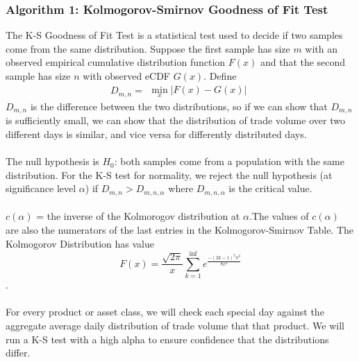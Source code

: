 \documentclass[11pt]{article}
\begin{document}
\subsubsection*{Algorithm 1: Kolmogorov-Smirnov Goodness of Fit Test}
The K-S Goodness of Fit Test is a statistical test used to decide if two samples come from the same distribution. Suppose the first sample has size $m$ with an observed empirical cumulative distribution function $F(x)$ and that the second sample has size $n$ with observed eCDF $G(x)$. Define
\begin{equation}D_{m,n} = 
\begin{aligned}
\min_{x} |F(x) - G(x)|
\end{aligned}
\end{equation}
$D_{m,n}$ is the difference between the two distributions, so if we can show that $D_{m,n}$ is sufficiently small, we can show that the distribution of trade volume over two different days is similar, and vice versa for differently distributed days. 
\\\\The null hypothesis is $H_0$: both samples come from a population with the same distribution. For the K-S test for normality, we reject the null hypothesis (at significance level $\alpha$) if $D_{m,n} > D_{m,n,\alpha}$ where $D_{m,n,\alpha}$ is the critical value. 
\\\\$c(\alpha)$ = the inverse of the Kolmorogov distribution at $\alpha$.The values of $c(\alpha)$ are also the numerators of the last entries in the Kolmogorov-Smirnov Table. The Kolmogorov Distribution has value $$F(x) = \frac{\sqrt{2\pi}}{x} \sum_{k=1}^{\inf} e^{\frac{-(2k-1)^2 \pi^2}{8x^2}}$$.
\\\\For every product or asset class, we will check each special day against the aggregate average daily distribution of trade volume that that product. We will run a K-S test with a high alpha to ensure confidence that the distributions differ.
\end{document}
